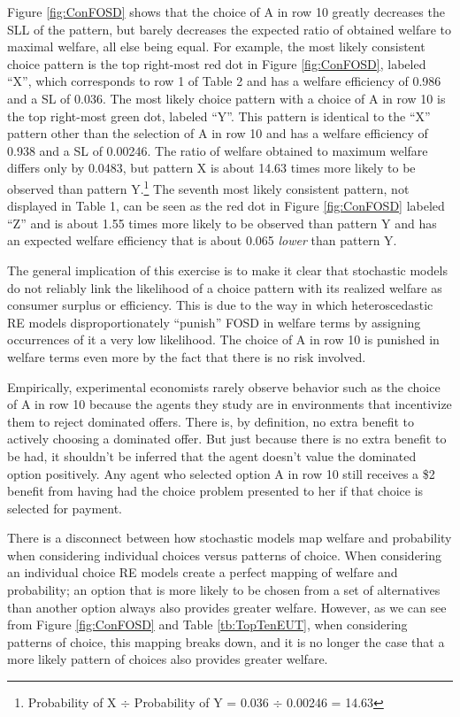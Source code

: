 \documentclass[../main.tex]{subfiles}
\begin{document}
Figure \ref{fig:ConFOSD} shows that the choice of A in row 10 greatly decreases the SLL of the pattern, but barely decreases the expected ratio of obtained welfare to maximal welfare, all else being equal.
For example, the most likely consistent choice pattern is the top right-most red dot in Figure \ref{fig:ConFOSD}, labeled \enquote{X}, which corresponds to row 1 of Table 2 and has a welfare efficiency of 0.986 and a SL of 0.036.
The most likely choice pattern with a choice of A in row 10 is the top right-most green dot, labeled \enquote{Y}.
This pattern is identical to the \enquote{X} pattern other than the selection of A in row 10 and has a welfare efficiency of 0.938 and a SL of 0.00246.
The ratio of welfare obtained to maximum welfare differs only by 0.0483, but pattern X is about 14.63 times more likely to be observed than pattern Y.\footnote{
	Probability of X $\div$ Probability of Y = 0.036 $\div$ 0.00246 = 14.63
}
The seventh most likely consistent pattern, not displayed in Table 1, can be seen as the red dot in Figure \ref{fig:ConFOSD} labeled \enquote{Z} and is about 1.55 times more likely to be observed than pattern Y and has an expected welfare efficiency that is about 0.065 \textit{lower} than pattern Y.

The general implication of this exercise is to make it clear that stochastic models do not reliably link the likelihood of a choice pattern with its realized welfare as consumer surplus or efficiency.
This is due to the way in which heteroscedastic RE models disproportionately \enquote{punish} FOSD in welfare terms by assigning occurrences of it a very low likelihood.
The choice of A in row 10 is punished in welfare terms even more by the fact that there is no risk involved.

Empirically, experimental economists rarely observe behavior such as the choice of A in row 10 because the agents they study are in environments that incentivize them to reject dominated offers.
There is, by definition, no extra benefit to actively choosing a dominated offer.
But just because there is no extra benefit to be had, it shouldn't be inferred that the agent doesn't value the dominated option positively.
Any agent who selected option A in row 10 still receives a \$2 benefit from having had the choice problem presented to her if that choice is selected for payment.

There is a disconnect between how stochastic models map welfare and probability when considering individual choices versus patterns of choice.
When considering an individual choice RE models create a perfect mapping of welfare and probability; an option that is more likely to be chosen from a set of alternatives than another option always also provides greater welfare.
However, as we can see from Figure \ref{fig:ConFOSD} and Table \ref{tb:TopTenEUT}, when considering patterns of choice, this mapping breaks down, and it is no longer the case that a more likely pattern of choices also provides greater welfare.
\end{document}
